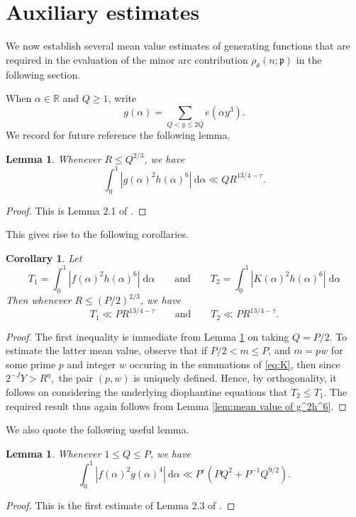 \documentclass[12pt,english,reqno]{amsart}
\theoremstyle{definition}
\theoremstyle{remark}
\numberwithin{equation}{section}
\numberwithin{equation}{section}
\numberwithin{figure}{section}
\theoremstyle{plain}
\theoremstyle{plain}
\theoremstyle{plain}
\newtheorem{lem}[thm]{Lemma}
\theoremstyle{plain}
\newtheorem{cor}[thm]{Corollary}
\numberwithin{equation}{section}
\numberwithin{thm}{section}
\begin{document}
\section{Auxiliary estimates}
We now establish several mean value estimates of generating functions
that are required in the evaluation of the minor arc contribution
$\rho_{\theta}(n;\mathfrak{p})$ in the following section. 
\par When $\alpha\in\mathbb{R}$ and $Q\geq1$, write
\begin{equation}
g(\alpha)=\sum_{Q<y\leq2Q}e(\alpha y^{3}).\label{eq:definition of g}\end{equation}
We record for future reference the following lemma.
\begin{lem}
\label{lem:mean value of g^2h^6}Whenever $R\leq Q^{2/3}$, we have
\[
\int_{0}^{1}|g(\alpha)^{2}h(\alpha)^{6}|\:\mathrm{d}\alpha\ll QR^{13/4-\tau}.\]
\end{lem}
\begin{proof}
This is Lemma 2.1 of \cite{BrudernWooley2009}.
\end{proof}
This gives rise to the following corollaries.
\begin{cor}
\label{lem:mean value of f^2h^6}Let
\[
T_{1}=\int_{0}^{1}|f(\alpha)^{2}h(\alpha)^{6}|\;\mathrm{d}\alpha\qquad\text{and}\qquad T_{2}=\int_{0}^{1}|K(\alpha)^{2}h(\alpha)^{6}|\;\mathrm{d}\alpha\]
Then whenever $R\leq(P/2)^{2/3}$, we have
\[
T_{1}\ll PR^{13/4-\tau}\qquad\text{and}\qquad T_{2}\ll PR^{13/4-\tau}.\]
\end{cor}
\begin{proof}
The first inequality is immediate from Lemma \ref{lem:mean value of g^2h^6}
on taking $Q=P/2$. To estimate the latter mean value, observe that
if $P/2<m\leq P$, and $m=pw$ for some prime $p$ and integer $w$
occuring in the summations of \eqref{eq:K}, then since $2^{-J}Y>R^{\eta},$
the pair $(p,w)$ is uniquely defined. Hence, by orthogonality, it
follows on considering the underlying diophantine equations that $T_{2}\leq T_{1}$.
The required result thus again follows from Lemma \eqref{lem:mean value of g^2h^6}.
\end{proof}
We also quote the following useful lemma.
\begin{lem}
\label{lem:mean value of f^2g^4}Whenever $1\leq Q\leq P$, we have
\[
\int_{0}^{1}|f(\alpha)^{2}g(\alpha)^{4}|\:\mathrm{d}\alpha\ll P^{\varepsilon}(PQ^{2}+P^{-1}Q^{9/2}).\]
\end{lem}
\begin{proof}
This is the first estimate of Lemma 2.3 of \cite{BrudernWooley2009}.
\end{proof}
\end{document}

